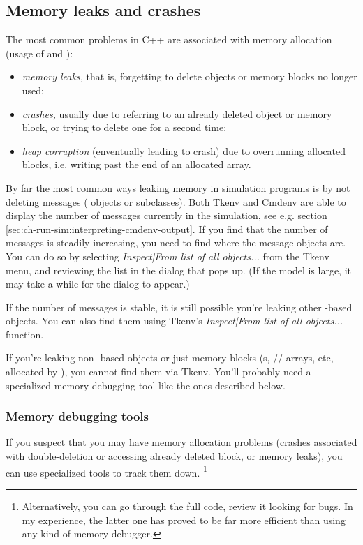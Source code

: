 \subsection{Memory leaks and crashes}

The most common problems in C++ are associated with memory allocation
(usage of  and ):

\begin{itemize}
   \item{\textit{memory leaks,} that is, forgetting to delete objects
     or memory blocks no longer used;}
   \item{\textit{crashes,} usually due to referring to an already deleted
     object or memory block, or trying to delete one for a second time;}
   \item{\textit{heap corruption} (enventually leading to crash) due to
     overrunning allocated blocks, i.e. writing past the end of an allocated
     array.}
\end{itemize}

By far the most common ways leaking memory in simulation programs
is by not deleting messages ( objects or subclasses).
Both Tkenv and Cmdenv are able to display the number of messages
currently in the simulation,
see e.g. section \ref{sec:ch-run-sim:interpreting-cmdenv-output}.
If you find that the number of messages is steadily increasing,
you need to find where the message objects are. You can do so
by selecting \textit{Inspect|From list of all objects...} from
the Tkenv menu, and reviewing the list in the dialog that pops up.
(If the model is large, it may take a while for the dialog to appear.)

If the number of messages is stable, it is still possible
you're leaking other -based objects. You can
also find them using Tkenv's \textit{Inspect|From list of all objects...}
function.

If you're leaking non--based objects or just
memory blocks (s, // arrays,
etc, allocated by ), you cannot find them via Tkenv.
You'll probably need a specialized memory debugging tool like
the ones described below.

\subsubsection{Memory debugging tools}

If you suspect that you may have memory allocation problems
(crashes associated with double-deletion or accessing already
deleted block, or memory leaks), you can use specialized tools
to track them down.
  \footnote{Alternatively, you can go through the full code,
  review it looking for bugs. In my experience, the latter one
  has proved to be far more efficient than using any kind
  of memory debugger.}

